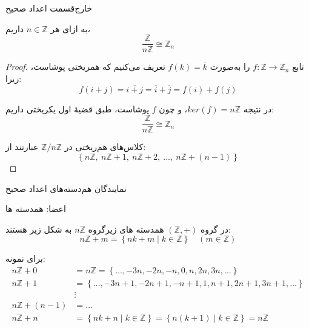 \begin{frame}[t]{خارج‌قسمت اعداد صحیح}
    \begin{example}
        به ازای هر
        \(n \in \mathbb{Z}\)
        داریم،
        \[
            \frac{\mathbb{Z}}{n\mathbb{Z}} \cong \mathbb{Z}_n
        \]


    \end{example}

    \begin{proof}
        تابع $f \colon \mathbb{Z} \to \mathbb{Z}_n$ را به‌صورت $f(k) = \overline{k}$ تعریف می‌کنیم که همریختی پوشاست، زیرا:
        \[
            f(i + j) = \overline{i + j} = \overline{i} + \overline{j} = f(i) + f(j)
        \]

        در نتیجه $ker(f) = n\mathbb{Z}$، و چون $f$ پوشاست، طبق قضیهٔ اول یکریختی داریم:
        \[
            \frac{\mathbb{Z}}{n\mathbb{Z}} \cong \mathbb{Z}_n
        \]

        کلاس‌های هم‌ریختی در $\mathbb{Z}/n\mathbb{Z}$ عبارتند از:
        \[
            \left\{ n\mathbb{Z},\ n\mathbb{Z}+1,\ n\mathbb{Z}+2,\ \ldots,\ n\mathbb{Z}+(n-1) \right\}
        \]
    \end{proof}


\end{frame}

\begin{frame}[t]{نمایندگان هم‌دسته‌های اعداد صحیح}

    \begin{remark}
        اعضا: همدسته ها

        در گروه $(\mathbb{Z}, +)$ همدسته های زیرگروه $n\mathbb{Z}$ به شکل زیر هستند:
        \[
            n\mathbb{Z} + m = \left\{ nk + m \mid k \in \mathbb{Z} \right\} \quad (m \in \mathbb{Z})
        \]

        برای نمونه:
        \begin{align*}
            n\mathbb{Z} + 0     & = n\mathbb{Z} = \left\{ \ldots, -3n, -2n, -n, 0, n, 2n, 3n, \ldots \right\}                                   \\
            n\mathbb{Z} + 1     & = \left\{ \ldots, -3n+1, -2n+1, -n+1, 1, n+1, 2n+1, 3n+1, \ldots \right\}                                     \\
                                & \vdots                                                                                                        \\
            n\mathbb{Z} + (n-1) & = \ldots                                                                                                      \\
            n\mathbb{Z} + n     & = \left\{ nk + n \mid k \in \mathbb{Z} \right\} = \left\{ n(k+1) \mid k \in \mathbb{Z} \right\} = n\mathbb{Z}
        \end{align*}
    \end{remark}


\end{frame}

